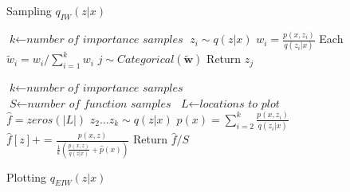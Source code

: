 \documentclass{article} %
\begin{document}
\begin{figure}[t]
  \centering
      \subfloat%
        {
            \begin{minipage}[t]{0.45\columnwidth}
            \begin{algorithm}[H]
            \caption{Sampling $q_{IW}(z|x)$}\label{sampling_qiw}
            \begin{algorithmic}[1]
                \State $\textit{k} \gets \textit{number of importance samples}$
                    \State $z_i \sim q(z|x)$
                    \State $w_i = \frac{p(x,z_i)}{q(z_i|x)}$
                \EndFor
                \State Each $\tilde w_i = w_i/\sum_{i=1}^{k} w_i$
                \State $j \sim Categorical(\bm{\tilde{w}})$
                \State Return $z_j$
            \end{algorithmic}
            \end{algorithm}
            \end{minipage}
        }
        \hspace{-.5cm}
        \qquad \qquad %
      \subfloat%
        {
            \begin{minipage}[t]{0.45\columnwidth}
            \begin{algorithm}[H]
            \caption{Plotting $q_{EIW}(z|x)$} \label{plotting_qeiw}        
            \begin{algorithmic}[1]
                \State $\textit{k} \gets \textit{number of importance samples}$
                \State $\textit{S} \gets \textit{number of function samples}$
                \State $\textit{L} \gets \textit{locations to plot}$
                \State $\hat f = zeros(|L|)$
                    \State $z_2\dots z_k \sim q(z|x)$
                    \State $\hat{p}(x)=\sum_{i=2}^{k} \frac{p(x,z_i)}{q(z_i|x)}$
                        \State $\hat f[z] \mathrel{{+}{=}} \frac{p(x,z)}{\frac{1}{k} \left(  \frac{p(x,z)}{q(z|x)}+ \hat{p}(x) \right)}$
                    \EndFor
                \EndFor
                \State Return ${\hat f} / S$
            \end{algorithmic}
            \end{algorithm}
            \end{minipage}
        }
\end{figure}
\end{document}
